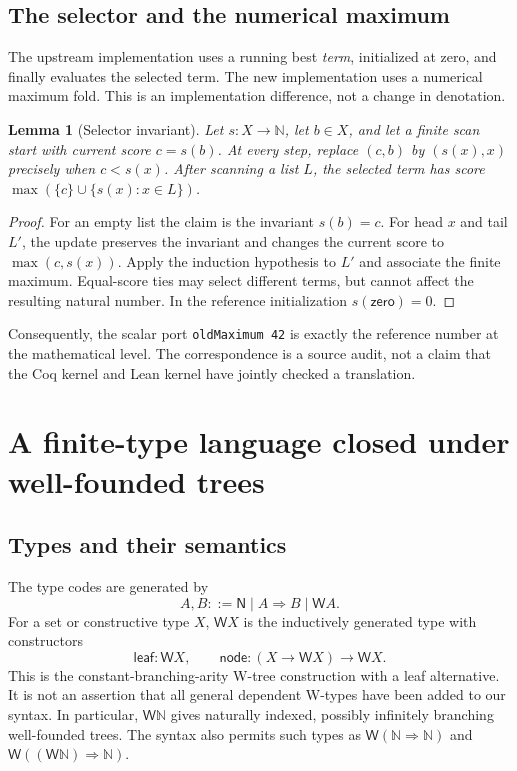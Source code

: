 \documentclass[11pt]{article}
\newtheorem{lemma}[theorem]{Lemma}
\theoremstyle{definition}
\newcommand{\N}{\mathbb N}
\newcommand{\W}{\mathsf W}
\begin{document}
\subsection{The selector and the numerical maximum}
The upstream implementation uses a running best \emph{term}, initialized at
zero, and finally evaluates the selected term. The new implementation uses a
numerical maximum fold. This is an implementation difference, not a change in
denotation.

\begin{lemma}[Selector invariant]\label{lem:selector}
Let $s:X\to\N$, let $b\in X$, and let a finite scan start with current score
$c=s(b)$. At every step, replace $(c,b)$ by $(s(x),x)$ precisely when $c<s(x)$.
After scanning a list $L$, the selected term has score
$\max(\{c\}\cup\{s(x):x\in L\})$.
\end{lemma}
\begin{proof}
For an empty list the claim is the invariant $s(b)=c$. For head $x$ and tail
$L'$, the update preserves the invariant and changes the current score to
$\max(c,s(x))$. Apply the induction hypothesis to $L'$ and associate the finite
maximum. Equal-score ties may select different terms, but cannot affect the
resulting natural number. In the reference initialization $s(\mathsf{zero})=0$.
\end{proof}
Consequently, the scalar port \texttt{oldMaximum 42} is exactly the reference
number at the mathematical level. The correspondence is a source audit, not a
claim that the Coq kernel and Lean kernel have jointly checked a translation.

\section{A finite-type language closed under well-founded trees}
\label{sec:language}
\subsection{Types and their semantics}
The type codes are generated by
\[
 A,B ::= \mathsf N\mid A\Rightarrow B\mid \W A.
\]
For a set or constructive type $X$, $\W X$ is the inductively generated type
with constructors
\[
 \mathsf{leaf}:\W X,\qquad
 \mathsf{node}:(X\to\W X)\to\W X.
\]
This is the constant-branching-arity W-tree construction with a leaf alternative.
It is not an assertion that all general dependent W-types have been added to
our syntax. In particular, $\W\N$ gives naturally indexed, possibly
infinitely branching well-founded trees. The syntax also permits such types as
$\W(\N\Rightarrow\N)$ and $\W((\W\N)\Rightarrow\N)$.
\end{document}
